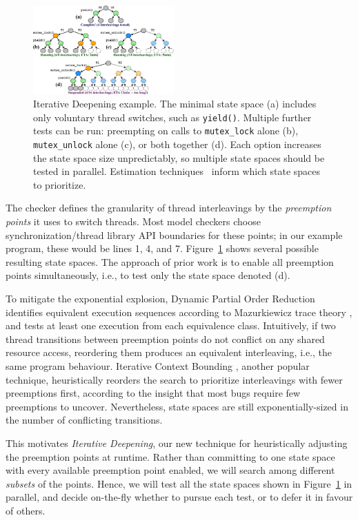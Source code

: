 \begin{figure}[t]
	\includegraphics[width=0.48\textwidth]{trees.pdf}
	\caption{Iterative Deepening example.
		The minimal state space (a) includes only voluntary thread switches, such as {\tt yield()}. %
		Multiple further tests can be run: preempting on calls to {\tt mutex\_lock} alone (b), {\tt mutex\_unlock} alone (c), or both together (d).
Each option increases the state space size unpredictably, so multiple state spaces should be tested in parallel.
Estimation techniques~\cite{estimation} inform which state spaces to prioritize.
}
	\label{fig:id}
\end{figure}

The checker defines the granularity of thread interleavings by the {\em preemption points} it uses to switch threads.
Most model checkers \cite{chess,dbug-ssv} choose synchronization/thread library API boundaries for these points;
in our example program, these would be lines 1, 4, and 7.
Figure~\ref{fig:id} shows several possible resulting state spaces.
The approach of prior work is to enable all preemption points simultaneously, i.e., to test only the state space denoted (d).

To mitigate the exponential explosion,
Dynamic Partial Order Reduction \cite{dpor} identifies equivalent execution sequences according to Mazurkiewicz trace theory \cite{mazurkiewicz},
and tests at least one execution from each equivalence class.
Intuitively, if two thread transitions between preemption points do not conflict on any shared resource access, reordering them produces an equivalent interleaving, i.e., the same program behaviour.
Iterative Context Bounding \cite{chess-icb}, another popular technique, heuristically reorders the search to prioritize interleavings with fewer preemptions first, according to the insight that most bugs require few preemptions to uncover.
Nevertheless, state spaces are still exponentially-sized in the number of conflicting transitions.

This motivates {\em Iterative Deepening}, our new technique for heuristically adjusting the preemption points at runtime.
Rather than committing to one state space with every available preemption point enabled,
we will search among different {\em subsets} of the points.
Hence, we will test all the state spaces shown in Figure~\ref{fig:id} in parallel,
and decide on-the-fly whether to pursue each test, or to defer it in favour of others.

